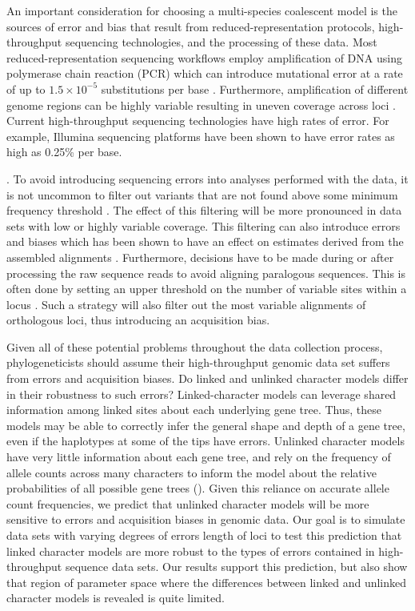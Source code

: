 An important consideration for choosing a multi-species coalescent model is
the sources of error and bias that result from reduced-representation protocols,
high-throughput sequencing technologies, and the processing of these data.
Most reduced-representation sequencing workflows employ amplification of DNA  
using polymerase chain reaction (PCR) which can introduce mutational error at a 
rate of up to $1.5\times10^{-5}$ substitutions per base \citep{potapovExaminingSourcesError2017}.
Furthermore, amplification of different genome regions can be highly variable 
resulting in uneven coverage across loci \citep{airdAnalyzingMinimizingPCR2011}. 
Current high-throughput sequencing technologies have high rates of error.
For example, Illumina sequencing platforms have been shown to have error rates
as high as 0.25\% per base. 

\citep{pfeifferSystematicEvaluationError2018}. 
To avoid introducing sequencing errors into analyses performed with the data, it is not 
uncommon to filter out variants that are not found above some minimum frequency 
threshold \citep{rochetteStacksAnalyticalMethods2019, linckMinorAlleleFrequency2019}. 
The effect of this filtering will be more pronounced in data sets with low or 
highly variable coverage.
This filtering can also introduce errors and biases which has been 
shown to have an effect on estimates derived from the assembled alignments
\citep{Harvey2015,linckMinorAlleleFrequency2019}.
Furthermore, decisions have to be made during or after processing
the raw sequence reads to avoid aligning paralogous sequences.
This is often done by setting an upper threshold on the number of variable
sites within a locus \citep{harveySimilarityThresholdsUsed2015}. 
Such a strategy will also filter out the most variable alignments
of orthologous loci, thus introducing an acquisition bias.

Given all of these potential problems throughout the data collection process,
phylogeneticists should assume their high-throughput genomic data set suffers
from errors and acquisition biases.
Do linked and unlinked character models differ in their robustness to such
errors?
Linked-character models can leverage shared information among linked sites
about each underlying gene tree.
Thus, these models may be able to correctly infer the general shape and depth
of a gene tree, even if the haplotypes at some of the tips have errors.
Unlinked character models have very little information about each gene tree,
and rely on the frequency of allele counts across many characters to inform the
model about the relative probabilities of all possible gene trees
().
Given this reliance on accurate allele count frequencies, we predict that
unlinked character models will be more sensitive to errors and acquisition
biases in genomic data.
Our goal is to simulate data sets with varying degrees of errors length of loci
to test this prediction that linked character models are more robust to the
types of errors contained in high-throughput sequence data sets.
Our results support this prediction, but also show that region of parameter
space where the differences between linked and unlinked character models is
revealed is quite limited.


